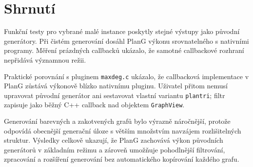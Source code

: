 \section{Shrnutí}
\label{sec:evaluation-summary}

Funkční testy pro vybrané malé instance poskytly stejné výstupy jako původní
generátory. Při čistém generování dosáhl PlanG výkonu srovnatelného s nativními
programy. Měření prázdných callbacků ukázalo, že samotné callbackové rozhraní
nepřidává významnou režii.

Praktické porovnání s pluginem \texttt{maxdeg.c} ukázalo, že callbacková
implementace v PlanG zůstává výkonově blízko nativnímu pluginu. Uživatel přitom
nemusí upravovat původní generátor ani sestavovat vlastní variantu
\texttt{plantri}; filtr zapisuje jako běžný C++ callback nad objektem
\texttt{GraphView}.

Generování barevných a zakotvených grafů bylo výrazně náročnější, protože
odpovídá obecnější generační úloze s větším množstvím navzájem rozlišitelných
struktur. Výsledky celkově ukazují, že PlanG zachovává výkon původních
generátorů v základním režimu a zároveň umožňuje pohodlnější filtrování,
zpracování a rozšíření generování bez automatického kopírování každého grafu.
